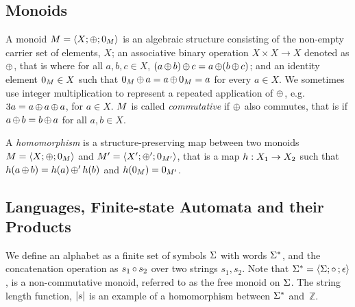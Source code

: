 \subsection{Monoids}



A monoid $M = \left\langle X;\operatorname{\oplus};0_{M}\right\rangle$ is an algebraic structure
consisting of the non-empty carrier set of elements, $X$; an associative binary operation
$X \times X \rightarrow X$ denoted as $\operatorname{\oplus}$, that is where for all $a, b,
c \in X$, $(a \operatorname{\oplus} b) \operatorname{\oplus} c = a \operatorname{\oplus} (b \operatorname{\oplus} c)$; 
and an identity element $0_{M} \in X$ such that
$0_{M} \operatorname{\oplus} a = a \operatorname{\oplus} 0_{M} =   a$ for every $a \in X$.
We sometimes use integer multiplication to represent a repeated application of
$\operatorname{\oplus}$, e.g. $3a = a \operatorname{\oplus} a \operatorname{\oplus} a$, for $a \in X$. $M$ is
called \textit{commutative} if $\operatorname{\oplus}$ also commutes, that is if $a
\operatorname{\oplus} b = b \operatorname{\oplus} a$ for all $a, b \in X$. 

A \textit{homomorphism} is a structure-preserving map between two
monoids $M = \left\langle X;\operatorname{\oplus};0_{M}\right\rangle$ and
$M' = \left\langle X';\operatorname{\oplus}';0_{M'}\right\rangle$, that is a map
$h : X_1 \rightarrow X_2$ such that
$h(a \operatorname{\oplus} b) = h(a) \operatorname{\oplus}' h(b)$ and
$h(0_{M}) = 0_{M'}$.

\subsection{Languages, Finite-state Automata and their Products}

We define an alphabet as a finite set of symbols $\Sigma$ with words $\Sigma^*$, and
the concatenation operation as $s_1 \operatorname{\circ}{} s_2$ over two strings $s_1, s_2$.
Note that $\Sigma^* = \left\langle\Sigma;\operatorname{\circ}{};\epsilon\right\rangle$, is a
non-commutative monoid, referred to as the free monoid on $\Sigma$.
The string length
function, $|s|$ is an example of a homomorphism between $\Sigma^*$
and~$\mathbb{Z}$.

